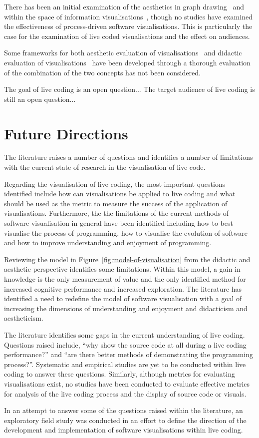 There has been an initial examination of the aesthetics in graph drawing~\cite{Purchase1996,Purchase2001} and within the space of information visualisations~\cite{Cawthon2007,Bell}, though no studies have examined the effectiveness of process-driven software visualisations. This is particularly the case for the examination of live coded visualisations and the effect on audiences.

Some frameworks for both aesthetic evaluation of visualisations~\cite{Cawthon2007,Purchase1996} and didactic evaluation of visualisations~\cite{VanWijk2005} have been developed through a thorough evaluation of the combination of the two concepts has not been considered.

The goal of live coding is an open question...
The target audience of live coding is still an open question...

\section{Future Directions}

The literature raises a number of questions and identifies a number of limitations with the current state of research in the visualisation of live code. 

Regarding the visualisation of live coding, the most important questions identified include how can visualisations be applied to live coding and what should be used as the metric to measure the success of the application of visualisations. Furthermore, the the limitations of the current methods of software visualisation in general have been identified including how to best visualise the process of programming, how to visualise the evolution of software~\cite{Gall1999} and how to improve understanding and enjoyment of programming.

Reviewing the model in Figure~\ref{fig:model-of-visualisation} from the didactic and aesthetic perspective identifies some limitations. Within this model, a gain in knowledge is the only measurement of value and the only identified method for increased cognitive performance and increased exploration. The literature has identified a need to redefine the model of software visualisation with a goal of increasing the dimensions of understanding and enjoyment and didacticism and aestheticism.

The literature identifies some gaps in the current understanding of live coding. Questions raised include, ``why show the source code at all during a live coding performance?'' and ``are there better methods of demonstrating the programming process?''. Systematic and empirical studies are yet to be conducted within live coding to answer these questions. Similarly, although metrics for evaluating visualisations exist, no studies have been conducted to evaluate effective metrics for analysis of the live coding process and the display of source code or visuals.

In an attempt to answer some of the questions raised within the literature, an exploratory field study was conducted in an effort to define the direction of the development and implementation of software visualisations within live coding.

